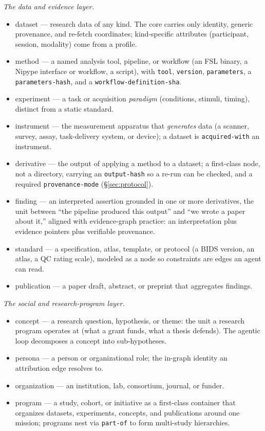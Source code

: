 \documentclass[preprint]{glimmer-paper}
\newcommand{\code}[1]{\texttt{#1}}
\newcommand{\node}[1]{\textsf{#1}}
\begin{document}
\emph{The data and evidence layer.}
\begin{itemize}
  \item \node{dataset} --- research data of any kind. The core carries only identity,
  generic provenance, and re-fetch coordinates; kind-specific attributes
  (participant, session, modality) come from a profile.
  \item \node{method} --- a named analysis tool, pipeline, or workflow (an FSL binary, a
  Nipype interface or workflow, a script), with \code{tool}, \code{version},
  \code{parameters}, a \code{parameters-hash}, and a \code{workflow-definition-sha}.
  \item \node{experiment} --- a task or acquisition \emph{paradigm} (conditions, stimuli,
  timing), distinct from a static standard.
  \item \node{instrument} --- the measurement apparatus that \emph{generates} data (a
  scanner, survey, assay, task-delivery system, or device); a dataset is
  \code{acquired-with} an instrument.
  \item \node{derivative} --- the output of applying a method to a dataset; a first-class
  node, not a directory, carrying an \code{output-hash} so a re-run can be checked, and a
  required \code{provenance-mode} (\S\ref{sec:protocol}).
  \item \node{finding} --- an interpreted assertion grounded in one or more derivatives,
  the unit between ``the pipeline produced this output'' and ``we wrote a paper about
  it,'' aligned with evidence-graph practice: an interpretation plus evidence pointers
  plus verifiable provenance.
  \item \node{standard} --- a specification, atlas, template, or protocol (a BIDS version,
  an atlas, a QC rating scale), modeled as a node so constraints are edges an agent can
  read.
  \item \node{publication} --- a paper draft, abstract, or preprint that aggregates
  findings.
\end{itemize}

\emph{The social and research-program layer.}
\begin{itemize}
  \item \node{concept} --- a research question, hypothesis, or theme: the unit a research
  program operates at (what a grant funds, what a thesis defends). The agentic loop
  decomposes a concept into sub-hypotheses.
  \item \node{persona} --- a person or organizational role; the in-graph identity an
  attribution edge resolves to.
  \item \node{organization} --- an institution, lab, consortium, journal, or funder.
  \item \node{program} --- a study, cohort, or initiative as a first-class container that
  organizes datasets, experiments, concepts, and publications around one mission; programs
  nest via \code{part-of} to form multi-study hierarchies.
\end{itemize}
\end{document}
